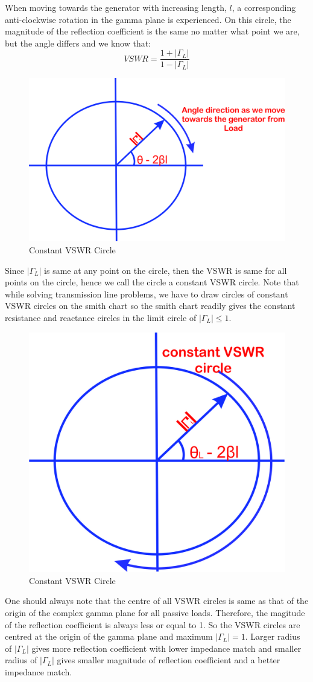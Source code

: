 When moving towards the generator with increasing length, $l$, a corresponding anti-clockwise rotation in the gamma plane is experienced. On this circle, the magnitude of the reflection coefficient is the same no matter what point we are, but the angle differs and we know that:
\begin{equation}
VSWR = \frac{1 + |\Gamma_L|}{1 - |\Gamma_L|}
\end{equation}
\begin{figure}[h]
\centering
\includegraphics[width=0.7\linewidth]{./graphics/lkjhgryn}
\caption{Constant VSWR Circle}
\label{fig:lkjhgryn}
\end{figure}

Since $|\Gamma_L|$ is same at any point on the circle, then the VSWR is same for all points on the circle, hence we call the circle a constant VSWR circle. Note that while solving transmission line problems, we have to draw circles of constant VSWR circles on the smith chart so the smith chart readily gives the constant resistance and reactance circles in the limit circle of $|\Gamma_L|\leq 1$.
\begin{figure}[h]
\centering
\includegraphics[width=0.5\linewidth]{./graphics/qwertyhgf}
\caption{Constant VSWR Circle}
\label{fig:qwertyhgf}
\end{figure}

One should always note that the centre of all VSWR circles is same as that of the origin of  the complex gamma plane for all passive loads. Therefore, the magitude of the reflection coefficient is always less or equal to 1. So the VSWR circles are centred at the origin of the gamma plane and maximum $|\Gamma_L|=1$. Larger radius of $|\Gamma_L|$ gives more reflection coefficient with lower impedance match and smaller radius of  $|\Gamma_L|$ gives smaller magnitude of reflection coefficient and a better impedance match.

